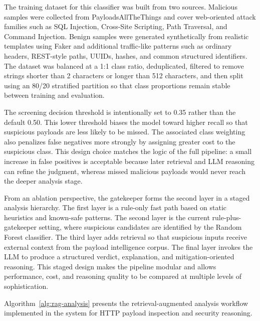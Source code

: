 The training dataset for this classifier was built from two sources. Malicious samples were collected from PayloadsAllTheThings and cover web-oriented attack families such as SQL Injection, Cross-Site Scripting, Path Traversal, and Command Injection. Benign samples were generated synthetically from realistic templates using Faker and additional traffic-like patterns such as ordinary headers, REST-style paths, UUIDs, hashes, and common structured identifiers. The dataset was balanced at a 1:1 class ratio, deduplicated, filtered to remove strings shorter than 2 characters or longer than 512 characters, and then split using an 80/20 stratified partition so that class proportions remain stable between training and evaluation.

The screening decision threshold is intentionally set to 0.35 rather than the default 0.50. This lower threshold biases the model toward higher recall so that suspicious payloads are less likely to be missed. The associated class weighting also penalizes false negatives more strongly by assigning greater cost to the suspicious class. This design choice matches the logic of the full pipeline: a small increase in false positives is acceptable because later retrieval and LLM reasoning can refine the judgment, whereas missed malicious payloads would never reach the deeper analysis stage.

From an ablation perspective, the gatekeeper forms the second layer in a staged analysis hierarchy. The first layer is a rule-only fast path based on static heuristics and known-safe patterns. The second layer is the current rule-plus-gatekeeper setting, where suspicious candidates are identified by the Random Forest classifier. The third layer adds retrieval so that suspicious inputs receive external context from the payload intelligence corpus. The final layer invokes the LLM to produce a structured verdict, explanation, and mitigation-oriented reasoning. This staged design makes the pipeline modular and allows performance, cost, and reasoning quality to be compared at multiple levels of sophistication.

Algorithm~\ref{alg:rag-analysis} presents the retrieval-augmented analysis workflow implemented in the system for HTTP payload inspection and security reasoning.

